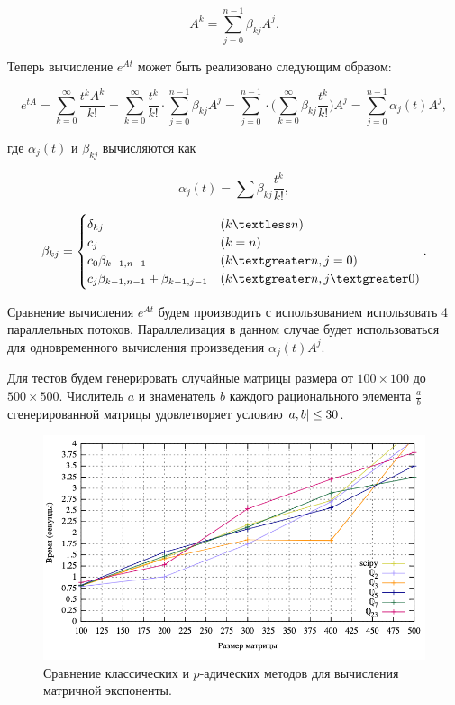 \documentclass[master, och, diploma, times]{sty/SCWorks}
\theoremstyle{plain}
\theoremstyle{definition}
\numberwithin{equation}{section}
\begin{document}
\begin{equation}
A^k=\sum\limits_{j=0}^{n-1} \beta_{kj}A^j.
\end{equation}


\noindent Теперь вычисление $e^{At}$ может быть реализовано следующим образом:


\begin{equation}
e^{tA}=\sum\limits_{k=0}^{\infty} \frac{t^kA^k}{k!}=\sum\limits_{k=0}^{\infty} \frac{t^k}{k!} \cdot \sum\limits_{j=0}^{n-1} \beta_{kj} A^j = \sum\limits_{j=0}^{n-1} \cdot \bigg(\sum\limits_{k=0}^{\infty} \beta_{kj} \frac{t^k}{k!} \bigg) A^j = \sum\limits_{j=0}^{n-1} \alpha_{j}(t)A^j,
\end{equation}

\noindent где $\alpha_{j}(t)$ и $\beta_{kj}$ вычисляются как

\begin{equation}
\alpha_{j}(t)=\sum \beta_{kj} \frac{t^k}{k!},
\end{equation}

\begin{equation}
\beta_{kj} = \begin{cases} 
\delta_{kj} & (k \textless n) \\
c_j & (k = n) \\
c_0 \beta_{k-1,n-1} & (k \textgreater n, j=0) \\
c_j \beta_{k-1,n-1}+\beta_{k-1,j-1} & (k \textgreater n, j \textgreater 0)
\end{cases}.
\end{equation}


Сравнение вычисления $e^{At}$ будем производить с использованием использовать 4 параллельных потоков. Параллелизация в данном случае будет использоваться для одновременного вычисления произведения $\alpha_{j}(t)A^j$.

Для тестов будем генерировать случайные матрицы размера от \mbox{$100 \times 100$} до \mbox{$500 \times 500$}. Числитель $a$ и знаменатель $b$ каждого рационального элемента $\frac{a}{b}$ сгенерированной матрицы удовлетворяет условию $\abs{a,b} \leq 30$.

\begin{figure}[H]
\centerline{\includegraphics[width=0.85\linewidth]{../gnuplot/exp/plot.png}}
\caption{Сравнение классических и $p$-адических методов для вычисления матричной экспоненты.}
\label{img:exp:plot}
\end{figure}
\end{document}
